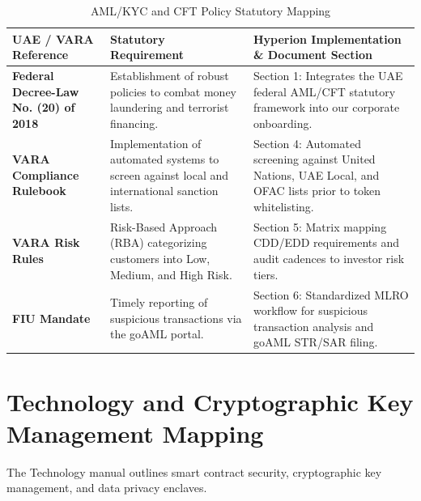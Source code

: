 \documentclass[11pt,a4paper]{article}
\begin{document}
\begin{table}[h!]
\centering
\begin{tabularx}{\textwidth}{l p{5cm} X}
\toprule
\textbf{UAE / VARA Reference} & \textbf{Statutory Requirement} & \textbf{Hyperion Implementation \& Document Section} \\
\midrule
\textbf{Federal Decree-Law No. (20) of 2018} & Establishment of robust policies to combat money laundering and terrorist financing. & Section 1: Integrates the UAE federal AML/CFT statutory framework into our corporate onboarding. \\
\midrule
\textbf{VARA Compliance Rulebook} & Implementation of automated systems to screen against local and international sanction lists. & Section 4: Automated screening against United Nations, UAE Local, and OFAC lists prior to token whitelisting. \\
\midrule
\textbf{VARA Risk Rules} & Risk-Based Approach (RBA) categorizing customers into Low, Medium, and High Risk. & Section 5: Matrix mapping CDD/EDD requirements and audit cadences to investor risk tiers. \\
\midrule
\textbf{FIU Mandate} & Timely reporting of suspicious transactions via the goAML portal. & Section 6: Standardized MLRO workflow for suspicious transaction analysis and goAML STR/SAR filing. \\
\bottomrule
\end{tabularx}
\caption{AML/KYC and CFT Policy Statutory Mapping}
\end{table}

\clearpage

\section{Technology and Cryptographic Key Management Mapping}
The Technology manual outlines smart contract security, cryptographic key management, and data privacy enclaves.
\par\vspace{10pt}
\end{document}

